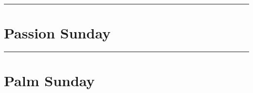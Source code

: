 {{\medskip
\hrule
{
\let\printhymnnote=\undefined
\section{Passion Sunday}
\label{lent5}\label{passionsunday}
\printcommonvespers[1]
\def\hymnlabel{hymn-vexillaregis}
\def\prehymn{\needspace{8\baselineskip}\printnote{All kneel for the sixth verse of the following hymn.}}
\def\vrlabel{vr-eripeme}
\def\hymninput{\gabcfolder/inc-hymn-VexillaRegis}
\def\premagtitle{\vspace{-0.5\baselineskip}}
\def\premagnificat{%
%
\needspace{14\baselineskip}}

\printcommemnote{}
}

\bigskip
\hrule
\medskip
{
\section{Palm Sunday}
\label{lent6}\label{palmsunday}
\printcommonvespers[1]
\renewcommand{\printhymnnote}{
	\noindent\printnote{Hymn.~\emph{Vexílla Regis}, page \pageref{hymn-vexillaregis}.
	\Vbar~\emph{Eripe me, Dómine}, page \pageref{vr-eripeme}.}
}

\bigskip
\benedicamusdomino{}
}

}
}
